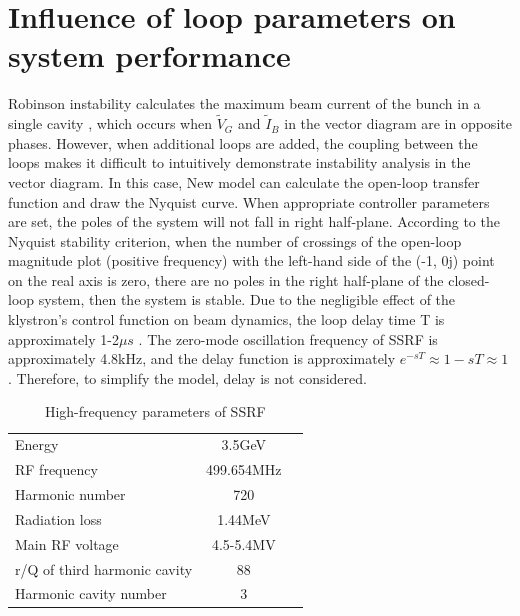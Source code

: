 \documentclass[letterpaper,
               nospread,     %
               ]{jacow}
\begin{document}
\section{Influence of loop parameters on system performance}
Robinson instability calculates the maximum beam current of the bunch in a single cavity
, which occurs when ${{\tilde{V}}_{G}}$ and ${{\tilde{I}}_{B}}$ in the vector diagram are
in opposite phases. However, when additional loops are added, the coupling between the loops
makes it difficult to intuitively demonstrate instability analysis in the vector diagram.
In this case, New model can calculate the open-loop transfer function and draw the Nyquist
curve. When appropriate controller parameters are set, the poles of the system will not
fall in right half-plane. According to the Nyquist stability criterion, when the number
of crossings of the open-loop magnitude plot (positive frequency) with the left-hand
side of the (-1, 0j) point on the real axis is zero, there are no poles in the right
half-plane of the closed-loop system, then the system is stable.
Due to the negligible effect of the klystron's control function on beam dynamics, the loop
delay time T is approximately 1-2$\mu s$ \cite{ref13}. The zero-mode oscillation frequency
of SSRF is approximately 4.8kHz, and the delay function is approximately
${e^{ - sT}} \approx 1 - sT \approx 1$. Therefore, to simplify the model, delay is not considered.
\begin{table}[!hbt]
   \centering
   \caption{High-frequency parameters of SSRF\cite{ref12}\cite{ref13}}
   \begin{tabular}{lcc}
      \toprule
      \midrule
      Energy                       & 3.5GeV     \\ %
      RF frequency                 & 499.654MHz \\ %
      Harmonic number              & 720        \\ %
      Radiation loss               & 1.44MeV    \\
      Main RF voltage              & 4.5-5.4MV  \\
      r/Q of third harmonic cavity & 88         \\
      Harmonic cavity number       & 3          \\
      \bottomrule
   \end{tabular}
   \label{tab:margins}
\end{table}
\end{document}
